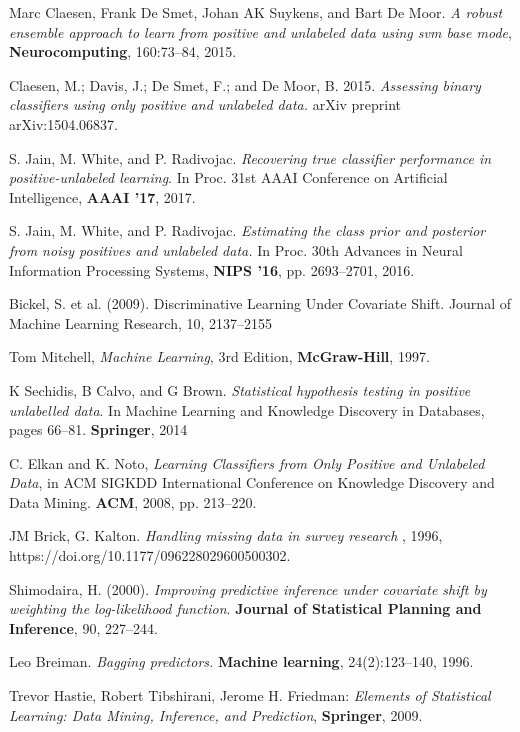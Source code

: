 \begin{thebibliography}{9}
Marc Claesen, Frank De Smet, Johan AK Suykens, and Bart De Moor. \textit{A robust ensemble approach to learn from positive and unlabeled data using svm base mode}, \textbf{Neurocomputing}, 160:73–84, 2015.

Claesen, M.; Davis, J.; De Smet, F.; and De Moor, B. 2015. \textit{Assessing binary classiﬁers using only positive and unlabeled data.} arXiv preprint arXiv:1504.06837.

S. Jain, M. White, and P. Radivojac. \textit{Recovering true classifier performance in positive-unlabeled learning}. In Proc. 31st AAAI Conference on Artificial Intelligence, \textbf{AAAI '17}, 2017.

S. Jain, M. White, and P. Radivojac. \textit{Estimating the class prior and posterior from noisy positives and unlabeled data.} In Proc. 30th Advances in Neural Information Processing Systems, \textbf{NIPS '16}, pp. 2693–2701, 2016.

Bickel, S. et al. (2009). Discriminative Learning Under Covariate Shift. Journal of Machine Learning Research, 10, 2137–2155

Tom Mitchell, \textit{Machine Learning}, 3rd Edition, \textbf{McGraw-Hill}, 1997.

K Sechidis, B Calvo, and G Brown. \textit{Statistical hypothesis testing in positive unlabelled data}. In Machine Learning and Knowledge Discovery in Databases, pages 66–81. \textbf{Springer}, 2014

C. Elkan and K. Noto, \textit{Learning Classifiers from Only Positive and Unlabeled Data}, in ACM SIGKDD International Conference on Knowledge Discovery and Data Mining. \textbf{ACM}, 2008, pp. 213–220.

JM Brick, G. Kalton. \textit{Handling missing data in survey research }, 1996, https://doi.org/10.1177/096228029600500302.

Shimodaira, H. (2000). \textit{Improving predictive inference under covariate shift by weighting the log-likelihood function}. \textbf{Journal of Statistical Planning and Inference}, 90, 227–244.

Leo Breiman. \textit{Bagging predictors.} \textbf{Machine learning}, 24(2):123–140, 1996.

Trevor Hastie, Robert Tibshirani, Jerome H. Friedman: \textit{Elements of Statistical Learning: Data Mining, Inference, and Prediction}, \textbf{Springer}, 2009.


\end{thebibliography}
